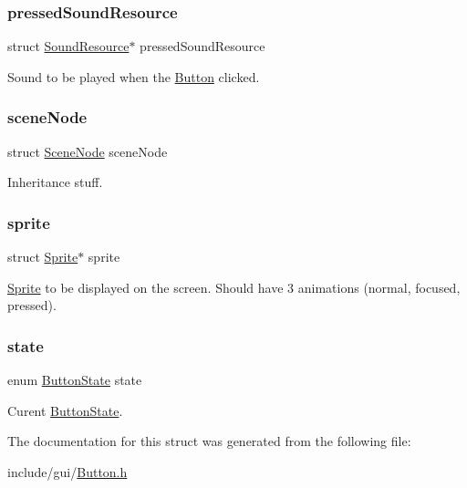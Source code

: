 \subsubsection{\texorpdfstring{pressed\+Sound\+Resource}{pressedSoundResource}}
{\footnotesize\ttfamily struct \hyperlink{struct_sound_resource}{Sound\+Resource}$\ast$ pressed\+Sound\+Resource}

Sound to be played when the \hyperlink{struct_button}{Button} clicked. \hypertarget{struct_button_aca8025f56fb4ce20b974ec9a3292a9e4}{}\label{struct_button_aca8025f56fb4ce20b974ec9a3292a9e4} 
\subsubsection{\texorpdfstring{scene\+Node}{sceneNode}}
{\footnotesize\ttfamily struct \hyperlink{struct_scene_node}{Scene\+Node} scene\+Node}

Inheritance stuff. \hypertarget{struct_button_a1128327f94baacb1570a98fca0591108}{}\label{struct_button_a1128327f94baacb1570a98fca0591108} 
\subsubsection{\texorpdfstring{sprite}{sprite}}
{\footnotesize\ttfamily struct \hyperlink{struct_sprite}{Sprite}$\ast$ sprite}

\hyperlink{struct_sprite}{Sprite} to be displayed on the screen. Should have 3 animations (normal, focused, pressed). \hypertarget{struct_button_a98525fefb11846bc0e1ee154b0a106d4}{}\label{struct_button_a98525fefb11846bc0e1ee154b0a106d4} 
\subsubsection{\texorpdfstring{state}{state}}
{\footnotesize\ttfamily enum \hyperlink{_button_8h_aa46074d34fe2d6631c6bd9dc74633657}{Button\+State} state}

Curent \hyperlink{_button_8h_aa46074d34fe2d6631c6bd9dc74633657}{Button\+State}. 

The documentation for this struct was generated from the following file\+:\begin{DoxyCompactItemize}
\item 
include/gui/\hyperlink{_button_8h}{Button.\+h}\end{DoxyCompactItemize}
